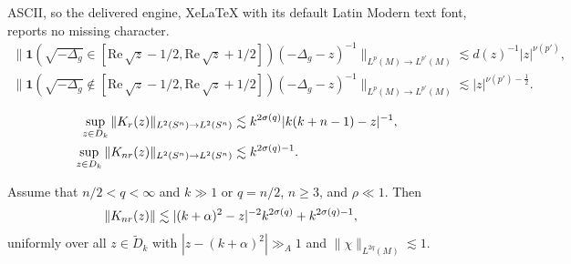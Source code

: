 \documentclass[10pt,a4paper]{amsart}
\newcommand\re{\mathrm{Re}\,}
\begin{document}
ASCII, so the delivered engine, XeLaTeX with its default Latin Modern text font, reports no missing character.
\begin{align}
\|\mathbf{1}(\sqrt{-\Delta_g}\in [\re\sqrt{z}-1/2,\re\sqrt{z}+1/2])(-\Delta_g-z)^{-1}\|_{L^{p}(M)\to L^{p'}(M)}\lesssim d(z)^{-1}|z|^{\nu(p')},\label{frequencies close to re sqrt z}\\
\|\mathbf{1}(\sqrt{-\Delta_g}\notin [\re\sqrt{z}-1/2,\re\sqrt{z}+1/2])(-\Delta_g-z)^{-1}\|_{L^{p}(M)\to L^{p'}(M)}\lesssim|z|^{\nu(p')-\frac{1}{2}}.\label{frequencies far from re sqrt z}
\end{align}

\begin{align}
\sup_{z\in D_k}\|K_{\rm r}(z)\|_{L^{2}(S^n)\to L^{2}(S^n)}&\lesssim k^{2\sigma(q)}|k(k+n-1)-z|^{-1},\label{bound Ksing}\\
\sup_{z\in D_k}\|K_{\rm nr}(z)\|_{L^{2}(S^n)\to L^{2}(S^n)}&\lesssim k^{2\sigma(q)-1}.\label{bound Kreg}
\end{align}

\begin{lemma}\label{lemma Zoll}
Assume that $n/2<q<\infty$ and $k\gg 1$ or $q=n/2$, $n\geq 3$, and $\rho\ll 1$. Then
    \begin{align}\label{bound Knr Zoll}
    \|K_{\rm nr}(z)\|&\lesssim |(k+\alpha)^2-z|^{-2}k^{2\sigma(q)}+k^{2\sigma(q)-1},
\end{align}
uniformly over all $z\in \tilde{D}_k$ with $|z-(k+\alpha)^2|\gg_A 1$ and $\|\chi\|_{L^{2q}(M)}\lesssim 1$.
\end{lemma} 
\end{document}
